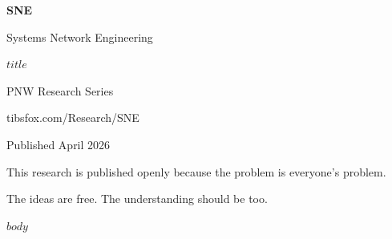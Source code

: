 \documentclass[11pt,a4paper]{article}
\begin{document}
\begin{titlepage}
\centering
\vspace*{3cm}
{\Huge\bfseries\sffamily\color{sneaccent} SNE\par}
\vspace{0.5cm}
{\LARGE\sffamily Systems Network Engineering\par}
\vspace{1cm}
{\Large\sffamily\color{snenet} $title$\par}
\vspace{2cm}
{\large\sffamily PNW Research Series\par}
{\normalsize\sffamily tibsfox.com/Research/SNE\par}
\vspace{1cm}
{\normalsize\sffamily\color{snemuted} Published April 2026\par}
\vfill
{\small\sffamily\color{snemuted} This research is published openly because the problem is everyone's problem.\par
The ideas are free. The understanding should be too.\par}
\end{titlepage}

$body$
\end{document}
